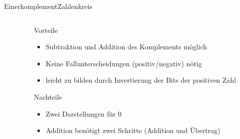 \documentclass[xelatex,aspectratio=169]{beamer}
\begin{document}
\begin{frame}{Einerkomplement}{Zahlenkreis}
\begin{columns}
\begin{column}{0.5\textwidth}
{
      }
    \end{column}
    \begin{column}{0.5\textwidth}
      \begin{exampleblock}{Vorteile}
        \begin{itemize}
          \item Subtraktion und Addition des Komplements möglich
          \item Keine Fallunterscheidungen (positiv/negativ) nötig
          \item leicht zu bilden durch Invertierung der Bits der positiven Zahl
        \end{itemize}
      \end{exampleblock}
      \begin{alertblock}{Nachteile}
        \begin{itemize}
          \item Zwei Darstellungen für 0
          \item Addition benötigt zwei Schritte (Addition und Übertrag)
        \end{itemize}

      \end{alertblock}
    \end{column}
  \end{columns}
\end{frame}
\end{document}
